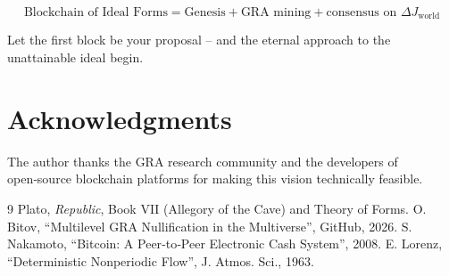 \documentclass[12pt,a4paper]{article}
\begin{document}
\[
\boxed{\text{Blockchain of Ideal Forms} = \text{Genesis} + \text{GRA mining} + \text{consensus on } \Delta J_{\text{world}}}
\]

Let the first block be your proposal – and the eternal approach to the unattainable ideal begin.

\section*{Acknowledgments}

The author thanks the GRA research community and the developers of open‑source blockchain platforms for making this vision technically feasible.

\begin{thebibliography}{9}
 Plato, \textit{Republic}, Book VII (Allegory of the Cave) and Theory of Forms.
 O. Bitov, ``Multilevel GRA Nullification in the Multiverse'', GitHub, 2026.
 S. Nakamoto, ``Bitcoin: A Peer‑to‑Peer Electronic Cash System'', 2008.
 E. Lorenz, ``Deterministic Nonperiodic Flow'', J. Atmos. Sci., 1963.
\end{thebibliography}
\end{document}
